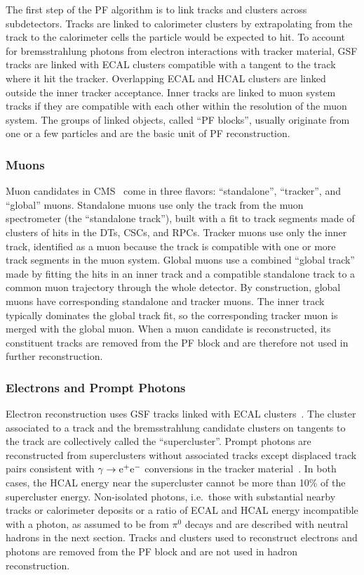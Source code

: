 The first step of the PF algorithm is to link tracks and clusters across subdetectors.
Tracks are linked to calorimeter clusters by extrapolating from the track to the calorimeter cells the particle would be expected to hit.
To account for bremsstrahlung photons from electron interactions with tracker material, GSF tracks are linked with ECAL clusters compatible with a tangent to the track where it hit the tracker.
Overlapping ECAL and HCAL clusters are linked outside the inner tracker acceptance.
Inner tracks are linked to muon system tracks if they are compatible with each other within the resolution of the muon system.
The groups of linked objects, called ``PF blocks'', usually originate from one or a few particles and are the basic unit of PF reconstruction.

\subsubsection{Muons}

Muon candidates in CMS~\cite{Chatrchyan:2012xi} come in three flavors: ``standalone'', ``tracker'', and ``global'' muons.
Standalone muons use only the track from the muon spectrometer (the ``standalone track''), built with a fit to track segments made of clusters of hits in the DTs, CSCs, and RPCs.
Tracker muons use only the inner track, identified as a muon because the track is compatible with one or more track segments in the muon system.
Global muons use a combined ``global track'' made by fitting the hits in an inner track and a compatible standalone track to a common muon trajectory through the whole detector.
By construction, global muons have corresponding standalone and tracker muons.
The inner track typically dominates the global track fit, so the corresponding tracker muon is merged with the global muon.
When a muon candidate is reconstructed, its constituent tracks are removed from the PF block and are therefore not used in further reconstruction.

\subsubsection{Electrons and Prompt Photons}

Electron reconstruction uses GSF tracks linked with ECAL clusters~\cite{Baffioni:2006cd,Adam:2005bya}.
The cluster associated to a track and the bremsstrahlung candidate clusters on tangents to the track are collectively called the ``supercluster''.
Prompt photons are reconstructed from superclusters without associated tracks except displaced track pairs consistent with $\mathrm{\gamma} \to \mathrm{e}^+\mathrm{e}^-$ conversions in the tracker material~\cite{Khachatryan:2015iwa}.
In both cases, the HCAL energy near the supercluster cannot be more than 10\% of the supercluster energy.
Non-isolated photons, i.e.\ those with substantial nearby tracks or calorimeter deposits or a ratio of ECAL and HCAL energy incompatible with a photon, as assumed to be from $\pi^0$ decays and are described with neutral hadrons in the next section.
Tracks and clusters used to reconstruct electrons and photons are removed from the PF block and are not used in hadron reconstruction.


